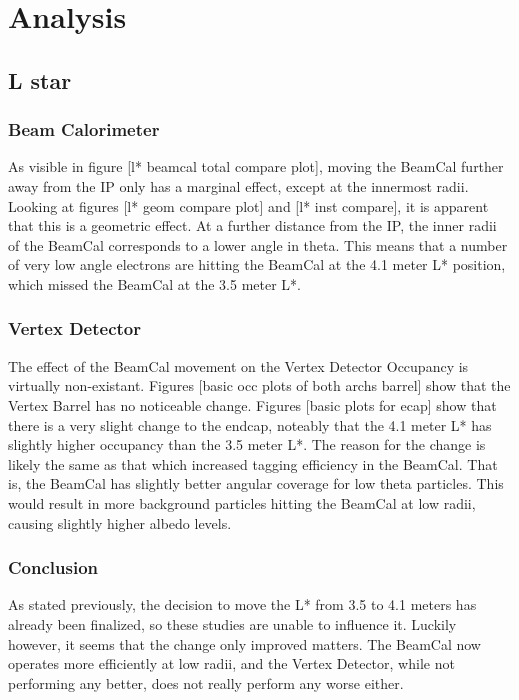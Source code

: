 \documentclass{report}
\begin{document}
    \chapter{Analysis}
        \section{L star}
            \subsection{Beam Calorimeter}
                As visible in figure [l* beamcal total compare plot], moving the BeamCal further away from the IP only has a marginal effect, except at the innermost radii. Looking at figures [l* geom compare plot] and [l* inst compare], it is apparent that this is a geometric effect. At a further distance from the IP, the inner radii of the BeamCal corresponds to a lower angle in theta. This means that a number of very low angle electrons are hitting the BeamCal at the 4.1 meter L* position, which missed the BeamCal at the 3.5 meter L*.
                
            \subsection{Vertex Detector} 
                The effect of the BeamCal movement on the Vertex Detector Occupancy is virtually non-existant. Figures [basic occ plots of both archs barrel] show that the Vertex Barrel has no noticeable change. Figures [basic plots for ecap] show that there is a very slight change to the endcap, noteably that the 4.1 meter L* has slightly higher occupancy than the 3.5 meter L*. The reason for the change is likely the same as that which increased tagging efficiency in the BeamCal. That is, the BeamCal has slightly better angular coverage for low theta particles. This would result in more background particles hitting the BeamCal at low radii, causing slightly higher albedo levels.

            \subsection{Conclusion}
                As stated previously, the decision to move the L* from 3.5 to 4.1 meters has already been finalized, so these studies are unable to influence it. Luckily however, it seems that the change only improved matters. The BeamCal now operates more efficiently at low radii, and the Vertex Detector, while not performing any better, does not really perform any worse either.
\end{document}
